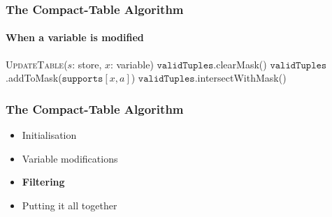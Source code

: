 \documentclass{beamer}
\newcommand{\CurrTable}{\texttt{validTuples}}
\newcommand{\Supports}{\texttt{supports}}
\newcommand{\FOREACH}[1]{\FORALL{{#1} \textbf{do}}}
\newcommand{\ENDFOREACH}{\ENDFOR}
\def\PROCEDURE{\item[\textbf{PROCEDURE}]}
\def\UpdateTable{\textsc{UpdateTable}}
\begin{document}
\begin{frame}
  \frametitle{The Compact-Table Algorithm}
  \framesubtitle{When a variable is modified}
  \begin{algorithm}[H]
    \small
    \begin{algorithmic}[1]
        \PROCEDURE \UpdateTable($s$: store, $x$: variable) \label{line:updateTableDelta:1} 
        \STATE $\CurrTable$.clearMask() \label{line:updateTableDelta:4} 
          \FOREACH{$a \in s(x)$} \label{line:updateTableDelta:8} 
            \STATE $\CurrTable$.addToMask($\Supports[x,a]$) \label{line:updateTableDelta:9} 
          \ENDFOREACH      
        \STATE $\CurrTable$.intersectWithMask() \label{line:updateTable:10} 
    \end{algorithmic}
  \end{algorithm}
\end{frame}

\begin{frame}
  \frametitle{The Compact-Table Algorithm}
  \begin{itemize}
  \item {\color{gray}Initialisation}
  \item {\color{gray}Variable modifications}
  \item \textbf{Filtering}
  \item {\color{gray}Putting it all together}
  \end{itemize}
\end{frame}
\end{document}
